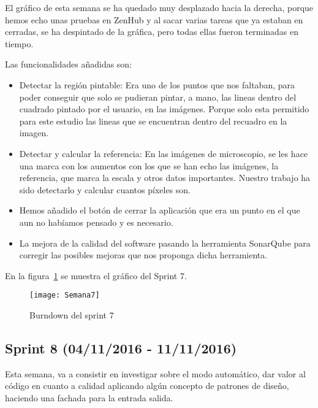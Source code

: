 El gráfico de esta semana se ha quedado muy desplazado hacia la derecha, porque hemos echo unas pruebas en ZenHub y al sacar varias tareas que ya estaban en cerradas, se ha despintado de la gráfica, pero todas ellas fueron terminadas en tiempo.

Las funcionalidades añadidas son:
\begin{itemize}
	\item Detectar la región pintable: Era uno de los puntos que nos faltaban, para poder conseguir que solo se pudieran pintar, a mano, las lineas dentro del cuadrado pintado por el usuario, en las imágenes. Porque solo esta permitido para este estudio las lineas que se encuentran dentro del recuadro en la imagen.
	\item Detectar y calcular la referencia: En las imágenes de microscopio, se les hace una marca con los aumentos con los que se han echo las imágenes, la referencia, que marca la escala y otros datos importantes.
	Nuestro trabajo ha sido detectarlo y calcular cuantos píxeles son.
	
	\item Hemos añadido el botón de cerrar la aplicación que era un punto en el que aun no habíamos pensado y es necesario.
	
	\item La mejora de la calidad del software pasando la herramienta SonarQube para corregir las posibles mejoras que nos proponga dicha herramienta. 
\end{itemize}

En la figura~\ref{fig:A.2.7} se muestra el gráfico del Sprint 7.

\begin{figure}[h]
\centering
\texttt{[image: Semana7]}
\caption{Burndown del sprint 7}
\label{fig:A.2.7}
\end{figure}

\subsection{Sprint 8 (04/11/2016 - 11/11/2016)}
Esta semana, va a consistir en investigar sobre el modo automático, dar valor al código en cuanto a calidad aplicando algún concepto de patrones de diseño, haciendo una fachada para la entrada salida.

